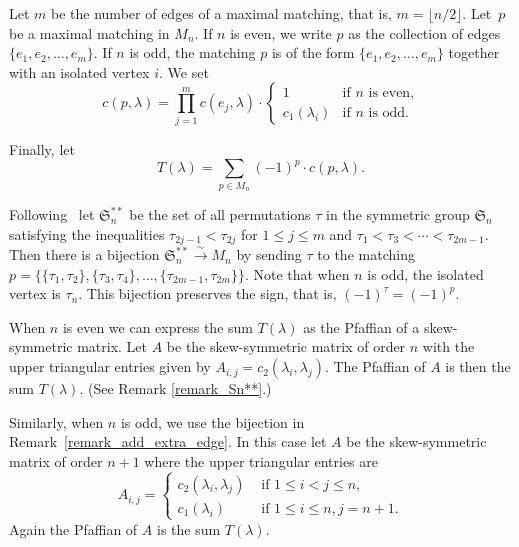 \documentclass[ALCO,ThmDefs,Unicode,epreuves]{cedram}
\newcommand{\Sym}{\mathfrak{S}}
\newcommand{\fl}{\rightarrow}
\newcommand{\iso}{\stackrel{\sim}{\fl}}
\begin{document}
Let $m$ be the number of edges of a maximal matching,
that is, $m = \lfloor n/2 \rfloor$.
Let~$p$ be a maximal matching in $M_{n}$.
If $n$ is even, we write $p$ as the collection of
edges~$\{e_{1}, e_{2}, \ldots, e_{m}\}$.
If $n$ is odd, the matching $p$
is of the form
$\{e_{1}, e_{2}, \ldots, e_{m}\}$
together with an isolated vertex $i$.
We set
$$
c(p,\lambda)=\prod_{j=1}^{m} c(e_{j},\lambda) 
\cdot
\begin{cases}
1 & \text{if $n$ is even,} \\
c_{1}(\lambda_{i}) & \text{if $n$ is odd.}
\end{cases}
$$



Finally, let
\begin{equation}
     T(\lambda)=\sum_{p\in M_{n}} (-1)^{p} \cdot c(p,\lambda) . 
\label{equation_T_lambda}
\end{equation}


\begin{remark}
{\rm
Following~\cite{Herb}
let $\Sym_{n}^{**}$
be the set of all permutations $\tau$
in the symmetric group $\Sym_{n}$
satisfying the inequalities
$\tau_{2j-1} < \tau_{2j}$ for
$1 \leq j \leq m$
and
$\tau_{1} < \tau_{3} < \cdots < \tau_{2m-1}$.
Then there is a bijection
$\Sym_{n}^{**} \iso M_{n}$
by sending $\tau$ to the matching
$p=\{\{\tau_{1},\tau_{2}\}, \{\tau_{3},\tau_{4}\},\ldots,
\{\tau_{2m-1},\tau_{2m}\}\}$.
Note that when $n$ is odd, the isolated vertex is $\tau_{n}$.
This bijection preserves the sign, that is,
$(-1)^{\tau} = (-1)^{p}$. 
}
\label{remark_Sn**}
\end{remark}


\begin{remark}
{\rm
When $n$ is even we can express the
sum $T(\lambda)$ as the Pfaffian of a skew-symmetric matrix.
Let $A$ be the skew-symmetric matrix of order $n$
with the upper triangular entries given by
$A_{i,j}=c_2(\lambda_{i},\lambda_{j})$.
The Pfaffian of $A$ is then the sum $T(\lambda)$. (See Remark \ref{remark_Sn**}.)

Similarly, when $n$ is odd, we use the bijection in
Remark~\ref{remark_add_extra_edge}.
In this case let $A$ be the skew-symmetric
matrix of order $n+1$ where
the upper triangular entries are 
$$ A_{i,j}
=
\begin{cases}
c_{2}(\lambda_{i},\lambda_{j})
& \text{ if } 1 \leq i < j \leq n , \\
c_{1}(\lambda_{i})
& \text{ if } 1 \leq i \leq n, j=n+1 .
\end{cases}
$$
Again the Pfaffian of $A$ is the sum $T(\lambda)$.
}
\end{remark}
\end{document}
